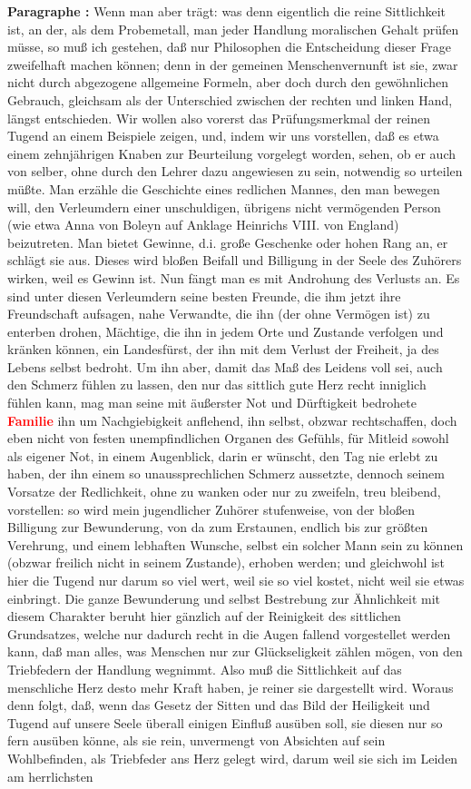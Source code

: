 \documentclass[a4paper,12pt,twoside]{book}
\newcommand{\match}[1]{\textcolor{red}{\textbf{#1}}}
\begin{document}
	\textbf{Paragraphe : }
	Wenn man aber trägt: was denn eigentlich die reine Sittlichkeit ist, an der, als dem Probemetall, man jeder Handlung moralischen Gehalt prüfen müsse, so muß ich gestehen, daß nur Philosophen die Entscheidung dieser Frage zweifelhaft machen können; denn in der gemeinen Menschenvernunft ist sie, zwar nicht durch abgezogene allgemeine Formeln, aber doch durch den gewöhnlichen Gebrauch, gleichsam als der Unterschied zwischen der rechten und linken Hand, längst entschieden. Wir wollen also vorerst das Prüfungsmerkmal der reinen Tugend an einem Beispiele zeigen, und, indem wir uns vorstellen, daß es etwa einem zehnjährigen Knaben zur Beurteilung vorgelegt worden, sehen, ob er auch von selber, ohne durch den Lehrer dazu angewiesen zu sein, notwendig so urteilen müßte. Man erzähle die Geschichte eines redlichen Mannes, den man bewegen will, den Verleumdern einer unschuldigen, übrigens nicht vermögenden Person (wie etwa Anna von Boleyn auf Anklage Heinrichs VIII. von England) beizutreten. Man bietet Gewinne, d.i. große Geschenke oder hohen Rang an, er schlägt sie aus. Dieses wird bloßen Beifall und Billigung in der Seele des Zuhörers wirken, weil es Gewinn ist. Nun fängt man es mit Androhung des Verlusts an. Es sind unter diesen Verleumdern seine besten Freunde, die ihm jetzt ihre Freundschaft aufsagen, nahe Verwandte, die ihn (der ohne Vermögen ist) zu enterben drohen, Mächtige, die ihn in jedem Orte und Zustande verfolgen und kränken können, ein Landesfürst, der ihn mit dem Verlust der Freiheit, ja des Lebens selbst bedroht. Um ihn aber, damit das Maß des Leidens voll sei, auch den Schmerz fühlen zu lassen, den nur  das sittlich gute Herz recht inniglich fühlen kann, mag man seine mit äußerster Not und Dürftigkeit bedrohete \match{Familie} ihn um Nachgiebigkeit anflehend, ihn selbst, obzwar rechtschaffen, doch eben nicht von festen unempfindlichen Organen des Gefühls, für Mitleid sowohl als eigener Not, in einem Augenblick, darin er wünscht, den Tag nie erlebt zu haben, der ihn einem so unaussprechlichen Schmerz aussetzte, dennoch seinem Vorsatze der Redlichkeit, ohne zu wanken oder nur zu zweifeln, treu bleibend, vorstellen: so wird mein jugendlicher Zuhörer stufenweise, von der bloßen Billigung zur Bewunderung, von da zum Erstaunen, endlich bis zur größten Verehrung, und einem lebhaften Wunsche, selbst ein solcher Mann sein zu können (obzwar freilich nicht in seinem Zustande), erhoben werden; und gleichwohl ist hier die Tugend nur darum so viel wert, weil sie so viel kostet, nicht weil sie etwas einbringt. Die ganze Bewunderung und selbst Bestrebung zur Ähnlichkeit mit diesem Charakter beruht hier gänzlich auf der Reinigkeit des sittlichen Grundsatzes, welche nur dadurch recht in die Augen fallend vorgestellet werden kann, daß man alles, was Menschen nur zur Glückseligkeit zählen mögen, von den Triebfedern der Handlung wegnimmt. Also muß die Sittlichkeit auf das menschliche Herz desto mehr Kraft haben, je reiner sie dargestellt wird. Woraus denn folgt, daß, wenn das Gesetz der Sitten und das Bild der Heiligkeit und Tugend auf unsere Seele überall einigen Einfluß ausüben soll, sie diesen nur so fern ausüben könne, als sie rein, unvermengt von Absichten auf sein Wohlbefinden, als Triebfeder ans Herz gelegt wird, darum weil sie sich im Leiden am herrlichsten 
\end{document}
